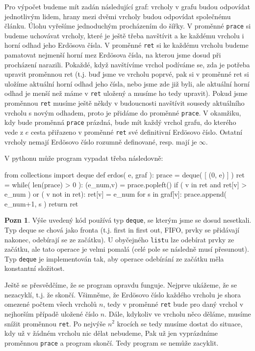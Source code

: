 \documentclass[a4paper,10pt,oneside]{article}
\theoremstyle{definition}
\newtheorem*{note}{Pozn}
\begin{document}
Pro výpočet budeme mít zadán následující graf: vrcholy v grafu budou odpovídat jednotlivým lidem, hrany mezi dvěmi vrcholy budou odpovídat
společnému článku. Úlohu vyřešíme jednoduchým procházením do šířky. V proměnné {\tt prace} si budeme uchovávat vrcholy, které je ještě třeba
navštívit a ke každému vrcholu i horní odhad jeho Erdösova čísla. V proměnné {\tt ret} si ke každému vrcholu budeme pamatovat nejmenší horní
mez Erdösova čísla, na kterou jsme dosud při procházení narazili. Pokaždé, když navštívíme vrchol podíváme se, zda je potřeba upravit
proměnnou ret (t.j. buď jsme ve vrcholu poprvé, pak si v proměnné ret si uložíme aktuální horní odhad jeho čísla, nebo jsme zde již byli, 
ale aktuální horní odhad je menší než máme v {\tt ret} uložený a musíme ho tedy upravit). Pokud jsme proměnnou {\tt ret} musíme ještě někdy v budoucnosti
navštívit sousedy aktuálního vrcholu s novým odhadem, proto je přidáme do proměnné {\tt prace}. V okamžiku, kdy bude proměnná {\tt prace} prázdná,
bude mít každý vrchol grafu, do kterého vede z $e$ cesta přiřazeno v proměnné {\tt ret} své definitivní Erdösovo číslo. Ostatní vrcholy nemají 
Erdösovo číslo rozumně definované, resp. mají je $\infty$.

V pythonu může program vypadat třeba následovně:

\begin{python}
 from collections import deque
 def erdos( e, graf ):
    prace = deque( [ (0, e) ] )
    ret = {}
    while( len(prace) > 0 ):
        (e_num,v) = prace.popleft()
        if ( v in ret and ret[v] > e_num ) or ( v not in ret):
            ret[v] = e_num
            for s in graf[v]:
                prace.append( e_num+1, s )
    return ret
\end{python}


\begin{note} Výše uvedený kód používá typ {\tt deque}, se kterým jsme se dosud nesetkali. Typ deque se chová jako fronta (t.j. first in first out, FIFO,
prvky se přidávají nakonec, odebírají se ze začátku). U obyčejného {\tt list}u lze odebírat prvky ze začátku, ale tato operace je velmi pomalá
(celé pole se následně musí přesunout). Typ {\tt deque} je implementován tak, aby operace odebírání ze začátku měla konstantní složitost. 
\end{note}

Ještě se přesvědčíme, že se program opravdu funguje. Nejprve ukážeme, že se nezacyklí, t.j. že skončí. Všimněme, že Erdösovo číslo každého vrcholu je 
shora omezené počtem všech vrcholů $n$, tedy v proměnné {\tt ret} bude pro daný vrchol v nejhorším případě uložené číslo $n$. Dále, kdykoliv ve vrcholu něco 
děláme, musíme snížit proměnnou {\tt ret}. Po nejvýše $n^2$ krocích se tedy musíme dostat do situace, kdy už v žádném vrcholu nic dělat nebudeme, 
Pak už jen vyprázdníme proměnnou {\tt prace} a program skončí. Tedy program se nemůže zacyklit. 
\end{document}
